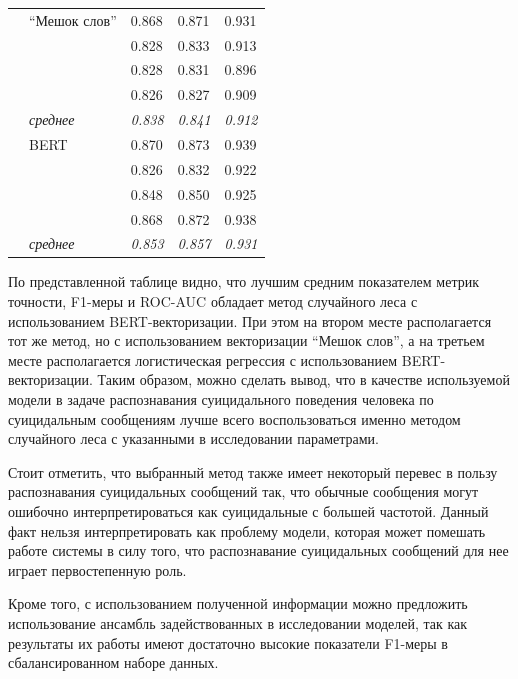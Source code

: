 \begin{table}[H]
\begin{center}
\begin{tabular}{|p{3cm}|p{4cm}|p{2.5cm}|p{2.5cm}|p{2.5cm}|}
			\multirow{8}{*}{\shortstack[l]{Перцептрон}} 
			& ``Мешок слов'' & 0.868 & 0.871 & 0.931 \\
				& & 0.828 & 0.833 & 0.913 \\
				& & 0.828 & 0.831 & 0.896 \\
				& & 0.826 & 0.827 & 0.909 \\
				\cline{2-5} & \textit{среднее} & \textit{0.838} & \textit{0.841} & \textit{0.912} \\
			\cline{2-5}
			& BERT & 0.870 & 0.873 & 0.939 \\
				& & 0.826 & 0.832 & 0.922 \\
				& & 0.848 & 0.850 & 0.925 \\
				& & 0.868 & 0.872 & 0.938 \\
				\cline{2-5} & \textit{среднее} & \textit{0.853} & \textit{0.857} & \textit{0.931} \\
					
			\hline
		\end{tabular}
	\end{center}
\end{table}

По представленной таблице видно, что лучшим средним показателем метрик точности, F1-меры и ROC-AUC обладает метод случайного леса с использованием BERT-векторизации. При этом на втором месте располагается тот же метод, но с использованием векторизации ``Мешок слов'', а на третьем месте располагается логистическая регрессия с использованием BERT-векторизации. Таким образом, можно сделать вывод, что в качестве используемой модели в задаче распознавания суицидального поведения человека по суицидальным сообщениям лучше всего воспользоваться именно методом случайного леса с указанными в исследовании параметрами.

Стоит отметить, что выбранный метод также имеет некоторый перевес в пользу распознавания суицидальных сообщений так, что обычные сообщения могут ошибочно интерпретироваться как суицидальные с большей частотой. Данный факт нельзя интерпретировать как проблему модели, которая может помешать работе системы в силу того, что распознавание суицидальных сообщений для нее играет первостепенную роль.

Кроме того, с использованием полученной информации можно предложить использование ансамбль задействованных в исследовании моделей, так как результаты их работы имеют достаточно высокие показатели F1-меры в сбалансированном наборе данных.

